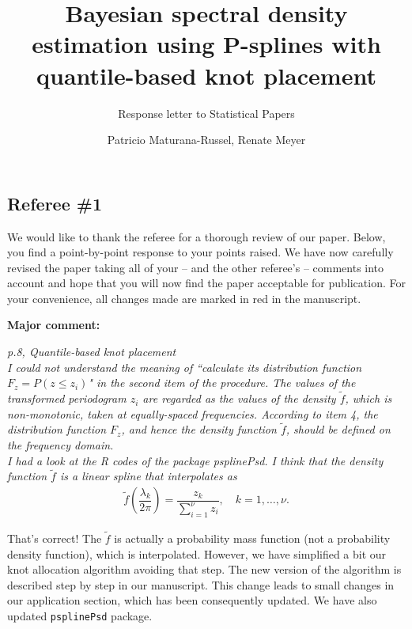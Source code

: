 \documentclass{scrartcl}
\title{Bayesian spectral density estimation using P-splines with quantile-based knot placement}
\subtitle{Response letter to Statistical Papers}
\author{Patricio Maturana-Russel, Renate Meyer}
\newcommand{\refereeQuote}{\textit }
\newcommand{\response}{}
\begin{document}
\maketitle\thispagestyle{empty}




\subsection*{Referee \#1}

\response{We would like to thank the referee for a thorough review of our paper. Below, you find a point-by-point response to your points raised. We have now carefully revised the paper taking all of your -- and the other referee's -- comments into account and hope that you will now find the paper acceptable for publication. For your convenience, all changes made are marked in red in the manuscript.} 

\textbf{Major comment:}

\refereeQuote{p.8, Quantile-based knot placement\\
I could not understand the meaning of ``calculate its distribution function $F_z = P(z \leq z_i)$" in the second item of the procedure.  The values of the transformed periodogram $z_i$ are regarded as the values of the density $\tilde{f}$, which is non-monotonic, taken at equally-spaced frequencies.  According to item 4, the distribution function $F_z$, and hence the density function $\tilde{f}$, should be defined on the frequency domain. \\
I had a look at the R codes of the package psplinePsd. I think that the density function $\tilde{f}$ is a linear spline that interpolates as
\begin{align*}
\tilde{f} \left(\dfrac{\lambda_k}{2\pi}\right) = \dfrac{z_k}{\sum_{i=1}^{\nu}z_i}, \quad k=1,\dots,\nu.
\end{align*}
}

\response{That's correct!  The $\widetilde{f}$ is actually a probability mass function (not a probability density function), which is interpolated.  However, we have simplified a bit our knot allocation algorithm avoiding that step.  The new version of the algorithm is described step by step in our manuscript.  This change leads to small changes in our application section, which has been consequently updated.  We have also updated \texttt{psplinePsd} package.}\bigskip 
\end{document}
